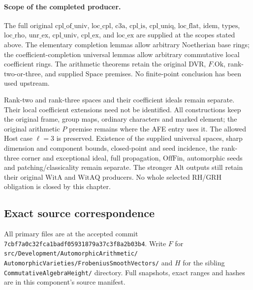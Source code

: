 \documentclass[11pt,a4paper]{article}
\numberwithin{equation}{section}
\theoremstyle{remark}\newtheorem{remark}[theorem]{Remark}
\begin{document}
\paragraph{Scope of the completed producer.}
The full original \(\mathrm{cpl\_\allowbreak of\_\allowbreak univ}\),
\(\mathrm{loc\_\allowbreak cpl}\), \(\mathrm{c3a}\),
\(\mathrm{cpl\_\allowbreak is}\), \(\mathrm{cpl\_\allowbreak uniq}\),
\(\mathrm{loc\_\allowbreak flat}\), \(\mathrm{idem}\),
\(\mathrm{types}\), \(\mathrm{loc\_\allowbreak rho}\),
\(\mathrm{unr\_\allowbreak ex}\), \(\mathrm{cpl\_\allowbreak univ}\),
\(\mathrm{cpl\_\allowbreak ex}\), and \(\mathrm{loc\_\allowbreak ex}\)
are supplied at the scopes stated above.  The elementary
completion lemmas allow arbitrary Noetherian base rings;
the coefficient-completion universal lemmas allow arbitrary
commutative local coefficient rings.  The arithmetic
theorems retain the original DVR, \(F.\mathrm{Ok}\),
rank-two-or-three, and supplied \(\mathrm{Space}\) premises.
No finite-point conclusion has been used upstream.

Rank-two and rank-three spaces and their coefficient ideals
remain separate.  Their local coefficient extensions need
not be identified.  All constructions keep the original
frame, group maps, ordinary characters and marked element;
the original arithmetic \(P\) premise remains where the
AFE entry uses it.  The allowed Host case \(\ell=3\) is
preserved.  Existence of the supplied universal spaces,
sharp dimension and component bounds, closed-point and
seed incidence, the rank-three corner and exceptional
ideal, full propagation, \(\mathrm{OffFin}\), automorphic
seeds and patching/classicality remain separate.  The
stronger Alt outputs still retain their original
\(\mathrm{WitA}\) and \(\mathrm{WitAQ}\) producers.
No whole selected RH/GRH obligation is closed by this chapter.

\subsection{Exact source correspondence}

All primary files are at the accepted commit
\texttt{7cbf7a0c32fca1badf05931879a37c3f8a2b03b4}.
Write \(F\) for
\texttt{src/\allowbreak Development/\allowbreak Automorphic\allowbreak Arithmetic/\allowbreak }
\texttt{Automorphic\allowbreak Varieties/\allowbreak Frobenius\allowbreak Smooth\allowbreak Vectors/\allowbreak }
and \(H\) for the sibling
\texttt{Commutative\allowbreak Algebra\allowbreak Height/\allowbreak } directory.
Full snapshots, exact ranges and hashes are in this component's
source manifest.
\end{document}
